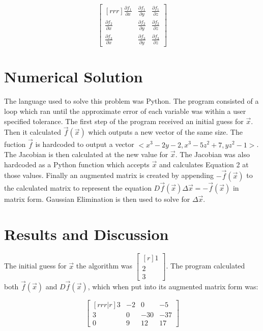\documentclass{article}
\begin{document}
\begin{equation}
    \renewcommand*{\arraystretch}{1.5}
    \begin{bmatrix}[rrr]
        \frac{\partial f_1}{\partial x} & \frac{\partial f_1}{\partial y} & \frac{\partial f_1}{\partial z} \\
        \frac{\partial f_2}{\partial x} & \frac{\partial f_2}{\partial y} & \frac{\partial f_2}{\partial z} \\
        \frac{\partial f_3}{\partial x} & \frac{\partial f_3}{\partial y} & \frac{\partial f_3}{\partial z}
    \end{bmatrix}
\end{equation}

\bigskip
\section*{Numerical Solution}

The language used to solve this problem was Python. The program consisted of a loop which ran until the approximate error of each variable was within a user specified tolerance. The first step of the program received an initial guess for $\vec{x}$. Then it calculated $\vec{f}(\vec{x})$ which outputs a new vector of the same size. The fuction $\vec{f}$ is hardcoded to output a vector $<\!\!x^3 - 2y - 2, x^3 - 5z^2 + 7, yz^2 - 1\!\!>$. The Jacobian is then calculated at the new value for $\vec{x}$. The Jacobian was also hardcoded as a Python function which accepts $\vec{x}$ and calculates Equation 2 at those values. Finally an augmented matrix is created by appending $-\vec{f}(\vec{x})$ to the calculated matrix to represent the equation $D\vec{f}(\vec{x}) \Delta \vec{x} = -\vec{f}(\vec{x})$ in matrix form. Gaussian Elimination is then used to solve for $\Delta \vec{x}$.

\pagebreak
\section*{Results and Discussion}

The initial guess for $\vec{x}$ the algorithm was $\begin{bmatrix}[r] 1\\2\\3 \end{bmatrix}$. The program calculated both $\vec{f}(\vec{x})$ and $D\vec{f}(\vec{x})$, which when put into its augmented matrix form was:

	\[ \begin{bmatrix}[rrr|r]
		3 & -2 & 0 & -5\\
		3 & 0 & -30 & -37\\
		0 & 9 & 12 & 17
	\end{bmatrix} \]
	
\end{document}
